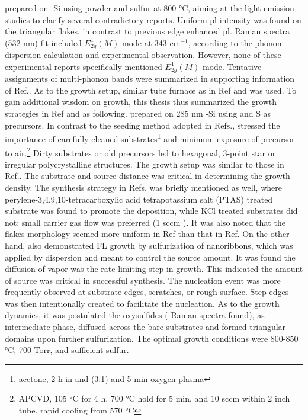 \citeauthor{Peimyoo2013} prepared  on -Si using  powder and sulfur at 800 \si{\degreeCelsius}, aiming at the light emission studies to clarify several contradictory reports.\cite{Peimyoo2013} Uniform \gls{pl} intensity was found on the triangular  flakes, in contrast to previous edge enhanced \gls{pl}\cite{Berkdemir2013}. Raman spectra (532 nm) fit included $E_{2g}^1(M)$ mode at 343 cm$^{-1}$, according to the phonon dispersion calculation \cite{Molina-Sanchez2011} and experimental observation.\cite{Zeng2013a,Zhao2013,Lee2013} However, none of these experimental reports specifically mentioned $E_{2g}^1(M)$ mode. Tentative assignments of multi-phonon bands were summarized in supporting information of Ref.\cite{Zhao2013}. As to the growth setup, similar tube furnace as in Ref \cite{VanderZande2013} and \cite{Najmaei2013} was used. To gain additional wisdom on  growth, this thesis thus summarized the growth strategies in Ref \cite{VanderZande2013} and \cite{Najmaei2013} as following. \citeauthor{VanderZande2013} prepared  on 285 nm -Si using  and S as precursors.\cite{VanderZande2013} In contrast to the seeding method adopted in Refs.\cite{Lee2013,Lee2012b}, \citeauthor{VanderZande2013} stressed the importance of carefully cleaned substrates\footnote{acetone, 2 h in  and  (3:1) and 5 min oxygen plasma} and minimum exposure of precursor to air.\footnote{APCVD, 105 \si{\degreeCelsius} for 4 h, 700 \si{\degreeCelsius} hold for 5 min, and 10 sccm  within 2 inch tube. rapid cooling from 570 \si{\degreeCelsius}} Dirty substrates or old precursors led to hexagonal, 3-point star or irregular polycrystalline structures. The growth setup was similar to those in Ref.\cite{Lee2012b}. The substrate and  source distance was critical in determining the growth density. The synthesis strategy in Refs.\cite{Lee2013,Lee2012b} was briefly mentioned as well, where perylene-3,4,9,10-tetracarboxylic acid tetrapotassium salt (PTAS) treated substrate was found to promote the deposition, while KCl treated substrates did not; small carrier gas flow was preferred (1 sccm ). It was also noted that the  flakes morphology seemed more uniform in Ref\cite{VanderZande2013} than that in Ref\cite{Lee2012b}. On the other hand, \citeauthor{Najmaei2013} also demonstrated  FL growth by sulfurization of  nanoribbons,\cite{Najmaei2013} which was applied by dispersion and meant to control the source amount. It was found the diffusion of vapor  was the rate-limiting step in  growth. This indicated the amount of source was critical in successful synthesis. The nucleation event was more frequently observed at substrate edges, scratches, or rough surface. Step edges was then intentionally created to facilitate the nucleation. As to the growth dynamics, it was postulated the oxysulfides ( Raman spectra found), as intermediate phase, diffused across the bare substrates and formed triangular domains upon further sulfurization. The optimal growth conditions were 800-850 \si{\degreeCelsius}, 700 Torr, and sufficient sulfur. 

